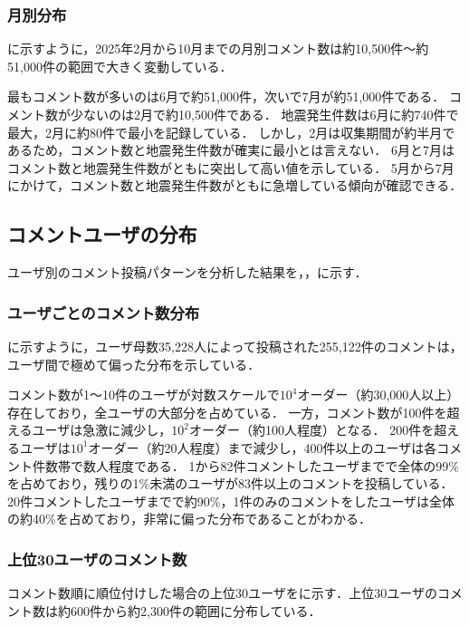 \subsubsection{月別分布}
に示すように，2025年2月から10月までの月別コメント数は約10,500件〜約51,000件の範囲で大きく変動している．



最もコメント数が多いのは6月で約51,000件，次いで7月が約51,000件である．
コメント数が少ないのは2月で約10,500件である．
地震発生件数は6月に約740件で最大，2月に約80件で最小を記録している．
しかし，2月は収集期間が約半月であるため，コメント数と地震発生件数が確実に最小とは言えない．
6月と7月はコメント数と地震発生件数がともに突出して高い値を示している．
5月から7月にかけて，コメント数と地震発生件数がともに急増している傾向が確認できる．

\subsection{コメントユーザの分布}

ユーザ別のコメント投稿パターンを分析した結果を，，に示す．


\subsubsection{ユーザごとのコメント数分布}
に示すように，ユーザ母数35,228人によって投稿された255,122件のコメントは，ユーザ間で極めて偏った分布を示している．



コメント数が1〜10件のユーザが対数スケールで$10^4$オーダー（約30,000人以上）存在しており，全ユーザの大部分を占めている．
一方，コメント数が100件を超えるユーザは急激に減少し，$10^2$オーダー（約100人程度）となる．
200件を超えるユーザは$10^1$オーダー（約20人程度）まで減少し，400件以上のユーザは各コメント件数帯で数人程度である．
1から82件コメントしたユーザまでで全体の99\%を占めており，残りの1\%未満のユーザが83件以上のコメントを投稿している．
20件コメントしたユーザまでで約90\%，1件のみのコメントをしたユーザは全体の約40\%を占めており，非常に偏った分布であることがわかる．

\subsubsection{上位30ユーザのコメント数}
コメント数順に順位付けした場合の上位30ユーザをに示す．上位30ユーザのコメント数は約600件から約2,300件の範囲に分布している．

